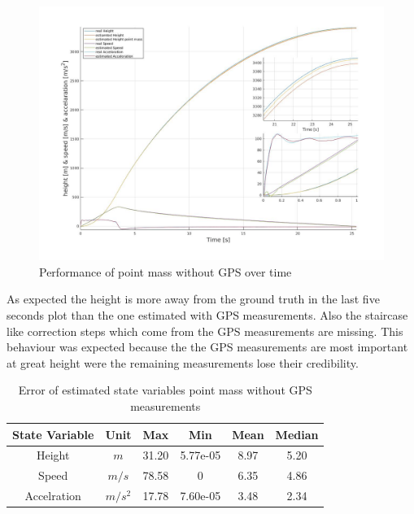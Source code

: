 \begin{figure}[h!]
 \centering
 \includegraphics[width=.8 \textwidth]{./Pictures/PointMassWihtoutGPSPerformance.jpg}
 \caption{Performance of point mass without GPS over time}
 \label{fig:PointMassWithoutGPSPerformance}
\end{figure}

As expected the height is more away from the ground truth in the last five seconds plot than the one estimated with GPS measurements.
Also the staircase like correction steps which come from the GPS measurements are missing.
This behaviour was expected because the the GPS measurements are most important at great height were the remaining measurements lose their credibility.


\begin{table}[h!]
\centering
\begin{tabular}{cccccc}
\hline
\multicolumn{1}{|c|}{State Variable} & \multicolumn{1}{c|}{Unit} & \multicolumn{1}{c|}{Max} & \multicolumn{1}{c|}{Min} & \multicolumn{1}{c|}{Mean} & \multicolumn{1}{c|}{Median} \\ \hline
Height                            & $m$                         & 31.20                  & 5.77e-05                 & 8.97                    & 5.20                      \\
Speed                             & $m/s$                       & 78.58                  & 0                        & 6.35                    & 4.86                      \\
Accelration                       & $m/s^2$   			& 17.78                  & 7.60e-05                 & 3.48                    & 2.34                     
\end{tabular}
\caption{Error of estimated state variables point mass without GPS measurements}
\label{tab:ErrorPointMassWithoutGPS}
\end{table}

